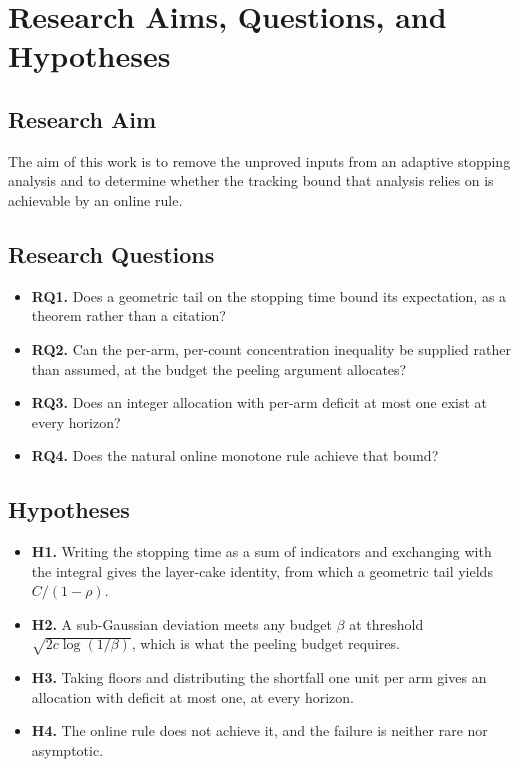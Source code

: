\section{Research Aims, Questions, and Hypotheses}

\subsection{Research Aim}

The aim of this work is to remove the unproved inputs from an adaptive stopping analysis and
to determine whether the tracking bound that analysis relies on is achievable by an online
rule.

\subsection{Research Questions}

\begin{itemize}
\item \textbf{RQ1.} Does a geometric tail on the stopping time bound its expectation, as a
theorem rather than a citation?
\item \textbf{RQ2.} Can the per-arm, per-count concentration inequality be supplied rather
than assumed, at the budget the peeling argument allocates?
\item \textbf{RQ3.} Does an integer allocation with per-arm deficit at most one exist at every
horizon?
\item \textbf{RQ4.} Does the natural online monotone rule achieve that bound?
\end{itemize}

\subsection{Hypotheses}

\begin{itemize}
\item \textbf{H1.} Writing the stopping time as a sum of indicators and exchanging with the
integral gives the layer-cake identity, from which a geometric tail yields $C/(1-\rho)$.
\item \textbf{H2.} A sub-Gaussian deviation meets any budget $\beta$ at threshold
$\sqrt{2c\log(1/\beta)}$, which is what the peeling budget requires.
\item \textbf{H3.} Taking floors and distributing the shortfall one unit per arm gives an
allocation with deficit at most one, at every horizon.
\item \textbf{H4.} The online rule does not achieve it, and the failure is neither rare nor
asymptotic.
\end{itemize}


